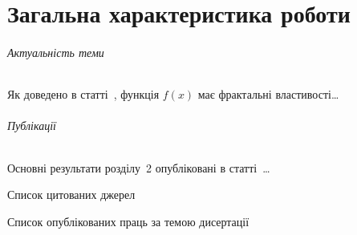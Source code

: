 \part{Загальна характеристика роботи}

\paragraph{Актуальність теми}

Як доведено в статті~\cite{riemann90}, функція $f(x)$ має фрактальні
властивості\ldots

\paragraph{Публікації}

Основні результати розділу~2 опубліковані в статті~\cite{thor09}\ldots

\begin{bibset}{Список цитованих джерел}


\end{bibset}

\begin{bibset}[a]{Список опублікованих праць за темою дисертації}


\end{bibset}

